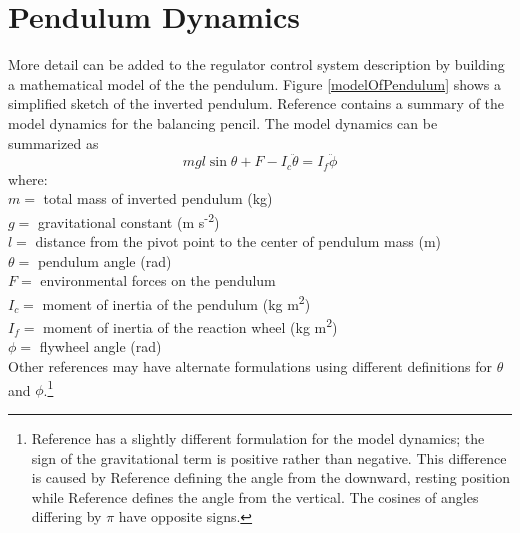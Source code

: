 \documentclass[12pt,letterpaper]{article}
\begin{document}
\section{Pendulum Dynamics}

More detail can be added to the regulator control system description by building a mathematical model of the the
pendulum.
Figure \ref{modelOfPendulum} shows a simplified sketch of the inverted pendulum.
Reference \cite{reactionWheel} contains a summary of the model dynamics for the balancing pencil.  
The model dynamics can be summarized as
%
\begin{equation}
    m g l \sin \theta + F - I_{c}\ddot{\theta}  = I_{f}\ddot{\phi}
\end{equation}
%
where: \\
$ m =$ total mass of inverted pendulum (kg)\\
$g =$ gravitational constant  (m s\textsuperscript{-2}) \\
$l =$ distance from the pivot point to the center of pendulum mass (m)\\
$\theta =$ pendulum angle (rad) \\
$F =$ environmental forces on the pendulum\\
$I_{c} =$ moment of inertia of the pendulum (kg m\textsuperscript{2}) \\
$I_{f} =$ moment of inertia of the reaction wheel (kg m\textsuperscript{2}) \\
$\phi =$ flywheel angle (rad) \\

Other references may have alternate formulations using different definitions for $\theta$ and $\phi$.\footnote{Reference \cite{monograph} has a slightly different formulation for the model dynamics; 
the sign of the gravitational term is positive rather than negative.  This difference is caused 
by Reference \cite{monograph} defining the angle from the downward, resting position
while Reference \cite{reactionWheel} defines the angle from the vertical.  
The cosines of angles differing by $\pi$ have opposite signs.}\\
\end{document}

